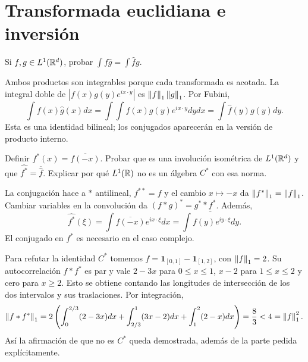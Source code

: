 \chapter{Transformada euclidiana e inversión}

\begin{ejercicio}\label{ej:v4-l10-1}
Si $f,g\in L^1(\mathbb R^d)$, probar $\int f\widehat g=\int\widehat f g$.
\end{ejercicio}
\begin{solucion}
Ambos productos son integrables porque cada transformada es acotada. La integral doble de $|f(x)g(y)e^{ix\cdot y}|$ es $\left\lVert f\right\rVert_1\left\lVert g\right\rVert_1$. Por Fubini,
\[
 \int f(x)\widehat g(x)dx=\int\int f(x)g(y)e^{ix\cdot y}dydx
 =\int\widehat f(y)g(y)dy.
\]
Esta es una identidad bilineal; los conjugados aparecerán en la versión de producto interno.
\end{solucion}

\begin{ejercicio}\label{ej:v4-l10-2}
Definir $f^*(x)=\overline{f(-x)}$. Probar que es una involución isométrica de $L^1(\mathbb R^d)$ y que $\widehat{f^*}=\overline{\widehat f}$. Explicar por qué $L^1(\mathbb R)$ no es un álgebra $C^*$ con esa norma.
\end{ejercicio}
\begin{solucion}
La conjugación hace a $*$ antilineal, $f^{**}=f$ y el cambio $x\mapsto-x$ da $\left\lVert f^*\right\rVert_1=\left\lVert f\right\rVert_1$. Cambiar variables en la convolución da $(f*g)^*=g^**f^*$. Además,
\[
 \widehat{f^*}(\xi)=\int\overline{f(-x)}e^{ix\cdot\xi}dx
 =\overline{\int f(y)e^{iy\cdot\xi}dy}.
\]
El conjugado en $f^*$ es necesario en el caso complejo.

Para refutar la identidad $C^*$ tomemos $f=\mathbf1_{[0,1]}-\mathbf1_{[1,2]}$, con $\left\lVert f\right\rVert_1=2$. Su autocorrelación $f*f^*$ es par y vale $2-3x$ para $0\leq x\leq1$, $x-2$ para $1\leq x\leq2$ y cero para $x\geq2$. Esto se obtiene contando las longitudes de intersección de los dos intervalos y sus traslaciones. Por integración,
\[
 \left\lVert f*f^*\right\rVert_1=2\left(\int_0^{2/3}(2-3x)dx+\int_{2/3}^1(3x-2)dx+\int_1^2(2-x)dx\right)=\frac83<4=\left\lVert f\right\rVert_1^2.
\]
Así la afirmación de que no es $C^*$ queda demostrada, además de la parte pedida explícitamente.
\end{solucion}

